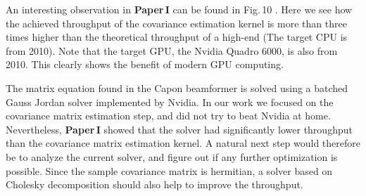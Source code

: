 An interesting observation in \textbf{Paper\,I} can be found in Fig.\,10 . Here we see how the achieved throughput of the covariance estimation kernel is more than three times higher than the theoretical throughput of a high-end  (The target CPU is from 2010). Note that the target GPU, the Nvidia Quadro 6000, is also from 2010. This clearly shows the benefit of modern GPU computing.

The matrix equation found in the Capon beamformer is solved using a batched Gauss Jordan solver implemented by Nvidia. In our work we focused on the covariance matrix estimation step, and did not try to beat Nvidia at home. Nevertheless, \textbf{Paper\,I} showed that the solver had significantly lower throughput than the covariance matrix estimation kernel. A natural next step would therefore be to analyze the current solver, and figure out if any further optimization is possible. Since the sample covariance matrix is hermitian, a solver based on Cholesky decomposition should also help to improve the throughput.

